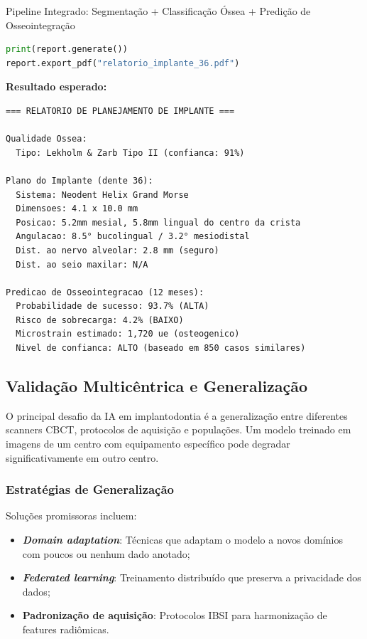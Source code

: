 \begin{pratica}{Pipeline Integrado: Segmentação + Classificação Óssea + Predição de Osseointegração}
\begin{lstlisting}[language=Python, caption={Pipeline completo de implantodontia assistida por IA}]
print(report.generate())
report.export_pdf("relatorio_implante_36.pdf")
\end{lstlisting}

\textbf{Resultado esperado:}
\begin{lstlisting}[style=saida]
=== RELATORIO DE PLANEJAMENTO DE IMPLANTE ===

Qualidade Ossea:
  Tipo: Lekholm & Zarb Tipo II (confianca: 91%)

Plano do Implante (dente 36):
  Sistema: Neodent Helix Grand Morse
  Dimensoes: 4.1 x 10.0 mm
  Posicao: 5.2mm mesial, 5.8mm lingual do centro da crista
  Angulacao: 8.5° bucolingual / 3.2° mesiodistal
  Dist. ao nervo alveolar: 2.8 mm (seguro)
  Dist. ao seio maxilar: N/A

Predicao de Osseointegracao (12 meses):
  Probabilidade de sucesso: 93.7% (ALTA)
  Risco de sobrecarga: 4.2% (BAIXO)
  Microstrain estimado: 1,720 ue (osteogenico)
  Nivel de confianca: ALTO (baseado em 850 casos similares)
\end{lstlisting}
\end{pratica}


\subsection{Validação Multicêntrica e Generalização}

O principal desafio da IA em implantodontia é a generalização entre diferentes scanners CBCT, protocolos de aquisição e populações. Um modelo treinado em imagens de um centro com equipamento específico pode degradar significativamente em outro centro.

\subsubsection{Estratégias de Generalização}

Soluções promissoras incluem:
\begin{itemize}
    \item \textbf{\textit{Domain adaptation}}: Técnicas que adaptam o modelo a novos domínios com poucos ou nenhum dado anotado;
    \item \textbf{\textit{Federated learning}}: Treinamento distribuído que preserva a privacidade dos dados;
    \item \textbf{Padronização de aquisição}: Protocolos IBSI para harmonização de features radiômicas.
\end{itemize}

